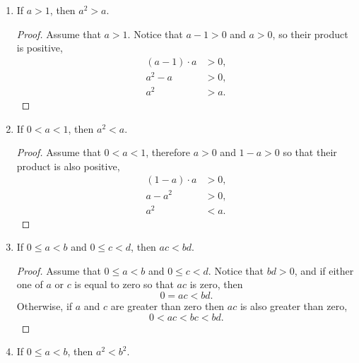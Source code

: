 \begin{exercise}[\textbf{5}]
\begin{enumerate}
         \begin{proof} Assume that $a<b$ and $c<0$. Then $b-a>0$ and $0-c =
         -c>0$, and their product must be positive,
              \begin{align*}
                  (b-a)\cdot -c &> 0, \\
                  -bc+ac &> 0, \\
                  ac&> bc.
              \end{align*}
         \end{proof}
         \item If $a>1$, then $a^2>a$.
         \begin{proof} Assume that $a>1$. Notice that $a-1>0$ and $a>0$, so
         their product is positive,
              \begin{align*}
                  (a-1)\cdot a &> 0, \\
                  a^2-a &>0,\\
                  a^2 &> a.
              \end{align*}
         \end{proof}
         \item If $0<a<1$, then $a^2<a$.
         \begin{proof} Assume that $0<a<1$, therefore $a>0$ and $1-a >0$ so that
         their product is also positive,
              \begin{align*}
                  (1-a)\cdot a &>0, \\
                    a-a^2 &> 0, \\
                    a^2 &< a.
              \end{align*}
         \end{proof}
         \item If $0\leq a<b$ and $0\leq c<d$, then $ac<bd$.
         \begin{proof}Assume that $0\leq a<b$ and $0\leq c<d$. Notice that
         $bd>0$, and if either one of $a$ or $c$ is equal to zero so that $ac$ is zero, then
              \begin{equation*}
                  0=ac<bd.
              \end{equation*}
              Otherwise, if $a$ and $c$ are greater than zero then $ac$ is also greater than zero,
              \begin{equation*}
                  0<ac<bc<bd.
              \end{equation*}
         \end{proof}
         \item If $0 \leq a<b$, then $a^2<b^2$.

\end{enumerate}
\end{exercise}
